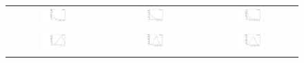\begin{figure}
\centering
\begin{tabular}{ccc}
\includegraphics[width=0.3\textwidth]{ANA_resources/Plots/Monte_carlo/data_vs_MC//Kpipipi/acos(Bd_DIRA_OWNPV)_2016.pdf} & \includegraphics[width=0.3\textwidth]{ANA_resources/Plots/Monte_carlo/data_vs_MC//Kpipipi/Bd_IPCHI2_OWNPV_2016.pdf} & \includegraphics[width=0.3\textwidth]{ANA_resources/Plots/Monte_carlo/data_vs_MC//Kpipipi/Bd_LOKI_VFASPF_VCHI2VDOF_2016.pdf} \\
\includegraphics[width=0.3\textwidth]{ANA_resources/Plots/Monte_carlo/data_vs_MC//Kpipipi/Bd_ptasy_1_50_2016.pdf} & \includegraphics[width=0.3\textwidth]{ANA_resources/Plots/Monte_carlo/data_vs_MC//Kpipipi/log10(D0_IPCHI2_OWNPV)_2016.pdf} & \includegraphics[width=0.3\textwidth]{ANA_resources/Plots/Monte_carlo/data_vs_MC//Kpipipi/log10(KstarK_IPCHI2_OWNPV)_2016.pdf} \\

\end{tabular}
\end{figure}
